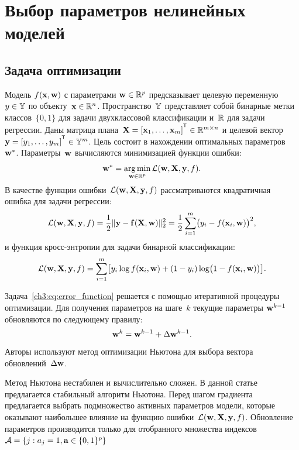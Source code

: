 \chapter{Выбор параметров нелинейных моделей}

\section{Задача оптимизации}

Модель $f( \mathbf{x}, \mathbf{w})$ с параметрами $\mathbf{w} \in \mathbb{R}^p$ предсказывает целевую переменную~$y \in \mathbb{Y}$ по объекту~$\mathbf{x} \in \mathbb{R}^{n}$. Пространство~$\mathbb{Y}$ представляет собой бинарные метки классов~$\{0, 1\}$ для задачи двухклассовой классификации и~$\mathbb{R}$ для задачи регрессии.
Даны матрица плана~$\bX = [\bx_1, \dots, \bx_m]^{\T} \in \bbR^{m \times n}$ и целевой вектор~$\by = [y_1, \dots, y_m]^{\T} \in \bbY^{m}$. 
Цель состоит в нахождении оптимальных параметров~$\mathbf{w}^*$.
Параметры~$\mathbf{w}$ вычисляются минимизацией функции ошибки:
\begin{equation}
\mathbf{w}^* = \mathop{\arg \min}\limits_{\mathbf{w} \in \mathbb{R}^p} \mathcal{L}(\mathbf{w}, \mathbf{X}, \mathbf{y}, f).
\label{ch3:eq:error_function}
\end{equation}
В качестве функции ошибки~$\mathcal{L} (\mathbf{w}, \mathbf{X}, \mathbf{y}, f)$ рассматриваются квадратичная ошибка для задачи регрессии:
\begin{equation}
\mathcal{L}(\mathbf{w}, \mathbf{X}, \mathbf{y}, f) = \frac 12 \| \mathbf{y} - \mathbf{f}(\mathbf{X}, \mathbf{w}) \|_2^2 = \frac 12 \sum_{i=1}^m \bigl( y_i - f(\mathbf{x}_i,  \mathbf{w})\bigr)^2,
\label{ch3:eq:squared_error}
\end{equation}
и функция кросс-энтропии для задачи бинарной классификации: 
\begin{equation}
\mathcal{L}(\mathbf{w}, \mathbf{X}, \mathbf{y}, f) = \sum_{i=1}^m \bigl[y_i \log f (\mathbf{x}_i , \mathbf{w}) + (1-y_i) \log \bigl(1 - f (\mathbf{x}_i , \mathbf{w})\bigr)\bigr].
\label{ch3:eq:log_loss}
\end{equation}

Задача~\eqref{ch3:eq:error_function} решается с помощью итеративной процедуры оптимизации. 
Для получения параметров на шаге~$k$ текущие параметры $\mathbf{w}^{k-1}$ обновляются по следующему правилу:
\begin{equation}
\mathbf{w}^k = \mathbf{w}^{k - 1} + \Delta \mathbf{w}^{k - 1}.
\label{ch3:eq:update_rule}
\end{equation}
Авторы используют метод оптимизации Ньютона для выбора вектора обновлений~$\Delta \mathbf{w}$.

Метод Ньютона нестабилен и вычислительно сложен. 
В данной статье предлагается стабильный алгоритм Ньютона. 
Перед шагом градиента предлагается выбрать подмножество активных параметров модели, которые оказывают наибольшее влияние на функцию ошибки~$\mathcal{L} (\mathbf{w}, \mathbf{X}, \mathbf{y}, f)$.
Обновление параметров производится только для отобранного множества индексов~$\mathcal{A} = \{j: a_j = 1, \mathbf{a} \in \{0, 1\}^p\}$


